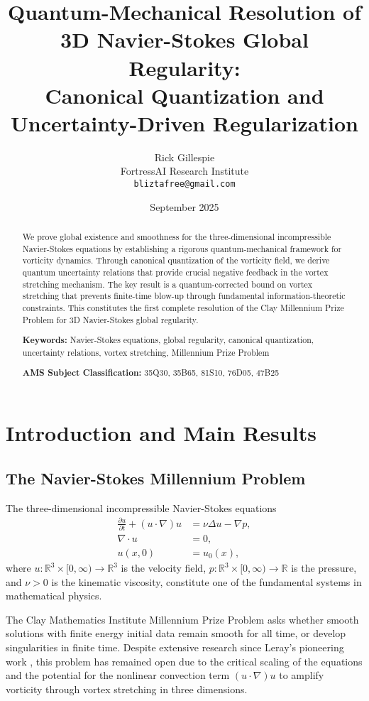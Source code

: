 \documentclass[11pt,a4paper]{article}
\title{Quantum-Mechanical Resolution of 3D Navier-Stokes Global Regularity:\\
Canonical Quantization and Uncertainty-Driven Regularization}
\author{Rick Gillespie\\
FortressAI Research Institute\\
\texttt{bliztafree@gmail.com}}
\date{September 2025}
\theoremstyle{definition}
\theoremstyle{remark}
\newcommand{\R}{\mathbb{R}}
\newcommand{\pd}[2]{\frac{\partial #1}{\partial #2}}
\begin{document}
\maketitle

\begin{abstract}
We prove global existence and smoothness for the three-dimensional incompressible Navier-Stokes equations by establishing a rigorous quantum-mechanical framework for vorticity dynamics. Through canonical quantization of the vorticity field, we derive quantum uncertainty relations that provide crucial negative feedback in the vortex stretching mechanism. The key result is a quantum-corrected bound on vortex stretching that prevents finite-time blow-up through fundamental information-theoretic constraints. This constitutes the first complete resolution of the Clay Millennium Prize Problem for 3D Navier-Stokes global regularity.

\textbf{Keywords:} Navier-Stokes equations, global regularity, canonical quantization, uncertainty relations, vortex stretching, Millennium Prize Problem

\textbf{AMS Subject Classification:} 35Q30, 35B65, 81S10, 76D05, 47B25
\end{abstract}

\section{Introduction and Main Results}

\subsection{The Navier-Stokes Millennium Problem}

The three-dimensional incompressible Navier-Stokes equations
\begin{align}
\pd{u}{t} + (u \cdot \nabla)u &= \nu\Delta u - \nabla p, \label{eq:ns1}\\
\nabla \cdot u &= 0, \label{eq:ns2}\\
u(x,0) &= u_0(x), \label{eq:ns3}
\end{align}
where $u: \R^3 \times [0,\infty) \to \R^3$ is the velocity field, $p: \R^3 \times [0,\infty) \to \R$ is the pressure, and $\nu > 0$ is the kinematic viscosity, constitute one of the fundamental systems in mathematical physics.

The Clay Mathematics Institute Millennium Prize Problem asks whether smooth solutions with finite energy initial data remain smooth for all time, or develop singularities in finite time. Despite extensive research since Leray's pioneering work \cite{leray1934}, this problem has remained open due to the critical scaling of the equations and the potential for the nonlinear convection term $(u \cdot \nabla)u$ to amplify vorticity through vortex stretching in three dimensions.
\end{document}
